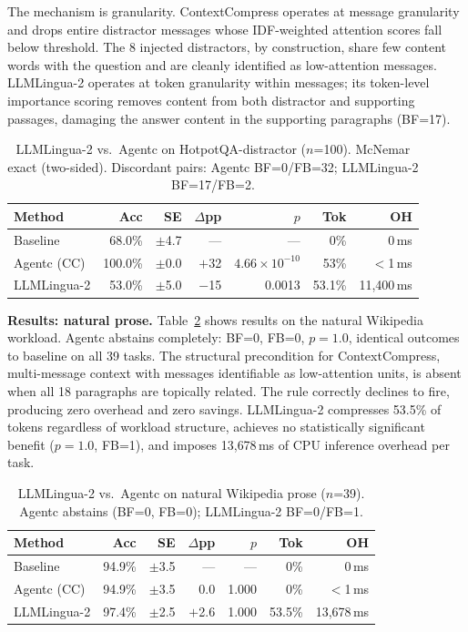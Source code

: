 \documentclass[sigconf,9pt]{acmart}
\begin{document}
The mechanism is granularity. ContextCompress operates at message granularity and
drops entire distractor messages whose IDF-weighted attention scores fall below
threshold. The 8 injected distractors, by construction, share few content words with
the question and are cleanly identified as low-attention messages. LLMLingua-2
operates at token granularity within messages; its token-level importance scoring
removes content from both distractor and supporting passages, damaging the answer
content in the supporting paragraphs (BF=17).

\begin{table}[t]
\caption{LLMLingua-2 vs.\ Agentc on HotpotQA-distractor ($n$=100).
McNemar exact (two-sided). Discordant pairs: Agentc BF=0/FB=32;
LLMLingua-2 BF=17/FB=2.}
\label{tab:llmlingua-distractor}
\footnotesize
\begin{tabularx}{\columnwidth}{@{} l r r r r r r @{}}
\toprule
Method & Acc & SE & $\Delta$pp & $p$ & Tok & OH \\
\midrule
Baseline    & 68.0\% & $\pm$4.7 & --- & --- & 0\% & 0\,ms \\
Agentc (CC) & 100.0\% & $\pm$0.0 & $+$32 & $4.66\!\times\!10^{-10}$ & 53\% & $<$1\,ms \\
LLMLingua-2 & 53.0\%  & $\pm$5.0 & $-$15 & 0.0013 & 53.1\% & 11{,}400\,ms \\
\bottomrule
\end{tabularx}
\end{table}

\textbf{Results: natural prose.} Table~\ref{tab:llmlingua-wikipedia} shows results on
the natural Wikipedia workload. Agentc abstains completely: BF=0, FB=0, $p=1.0$,
identical outcomes to baseline on all 39 tasks. The structural precondition for
ContextCompress, multi-message context with messages identifiable as low-attention
units, is absent when all 18 paragraphs are topically related. The rule correctly
declines to fire, producing zero overhead and zero savings. LLMLingua-2 compresses
53.5\% of tokens regardless of workload structure, achieves no statistically
significant benefit ($p=1.0$, FB=1), and imposes 13{,}678\,ms of CPU inference
overhead per task.

\begin{table}[t]
\caption{LLMLingua-2 vs.\ Agentc on natural Wikipedia prose ($n$=39).
Agentc abstains (BF=0, FB=0); LLMLingua-2 BF=0/FB=1.}
\label{tab:llmlingua-wikipedia}
\footnotesize
\begin{tabularx}{\columnwidth}{@{} l r r r r r r @{}}
\toprule
Method & Acc & SE & $\Delta$pp & $p$ & Tok & OH \\
\midrule
Baseline    & 94.9\% & $\pm$3.5 & --- & --- & 0\% & 0\,ms \\
Agentc (CC) & 94.9\% & $\pm$3.5 & 0.0 & 1.000 & 0\% & $<$1\,ms \\
LLMLingua-2 & 97.4\% & $\pm$2.5 & $+$2.6 & 1.000 & 53.5\% & 13{,}678\,ms \\
\bottomrule
\end{tabularx}
\end{table}
\end{document}
